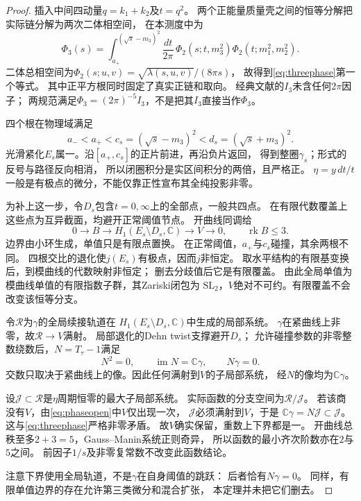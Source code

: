 \documentclass[11pt,a4paper]{ctexart}
\theoremstyle{cnplain}\newtheorem{theorem}{定理}[section]
\theoremstyle{definition}\newtheorem{definition}[theorem]{定义}
\theoremstyle{remark}\newtheorem{remark}[theorem]{注}
\newcommand{\rk}{\operatorname{rk}}\newcommand{\im}{\operatorname{im}}
\begin{document}
\begin{proof}
插入中间四动量$q=k_1+k_2$及$t=q^2$。
两个正能量质量壳之间的恒等分解把实际链分解为两次二体相空间，
在本测度中为
\[
 \Phi_3(s)=\int_{a_+}^{(\sqrt s-m_3)^2}
        \frac{dt}{2\pi}\,
        \Phi_2(s;t,m_3^2)\Phi_2(t;m_1^2,m_2^2).
\]
二体总相空间为$\Phi_2(s;u,v)=\sqrt{\lambda(s,u,v)}/(8\pi s)$，
故得到\eqref{eq:threephase}第一个等式。
其中正平方根同时固定了真实正链和取向。
经典文献的$I_3$未含任何$2\pi$因子；
两规范满足$\Phi_3=(2\pi)^{-5}I_3$，不是把其$I_3$直接当作$\Phi_3$。

四个根在物理域满足
\[
 a_-<a_+<c_s=(\sqrt s-m_3)^2<d_s=(\sqrt s+m_3)^2 .
\]
光滑紧化$E_s$属一。沿$[a_+,c_s]$的正片前进，再沿负片返回，
得到整圈$\gamma_s$；形式的反号与路径反向相消，
所以闭圈积分是实区间积分的两倍，且严格正。
$\eta=y\,dt/t$一般是有极点的微分，不能仅靠正性宣布其全纯投影非零。

为补上这一步，令$D_s$包含$t=0,\infty$上的全部点，一般共四点。
在有限代数覆盖上这些点为互异截面，均避开正常阈值节点。
开曲线同调给
\begin{equation}\label{eq:phaseopen}
 0\longrightarrow B\longrightarrow
 H_1(E_s\setminus D_s,\mathbb C)\longrightarrow V\longrightarrow0,
 \qquad \rk B\le3.
\end{equation}
边界由小环生成，单值只是有限点置换。
在正常阈值，$a_+$与$c_s$碰撞，其余两根不同。
四根交比的退化使$j(E_s)$有极点，因而$j$非恒定。
取水平结构的有限基变换后，到模曲线的代数映射非恒定；
删去分歧值后它是有限覆盖。
由此全局单值为模曲线单值的有限指数子群，其Zariski闭包为
$\mathrm{SL}_2$，$V$绝对不可约。有限覆盖不会改变该恒等分支。

令$\mathcal R$为$\gamma$的全局续接轨道在
$H_1(E_s\setminus D_s,\mathbb C)$中生成的局部系统。
$\gamma$在紧曲线上非零，故$\mathcal R\to V$满射。
局部退化的Dehn twist支撑避开$D_s$；
允许碰撞参数的非零整数绕数后，$N=T_\tau-1$满足
\[
 N^2=0,\qquad \im N=\mathbb C\gamma,\qquad N\gamma=0.
\]
交数只取决于紧曲线上的像。因此任何满射到$V$的子局部系统，
经$N$的像均为$\mathbb C\gamma$。

设$\mathcal J\subset\mathcal R$是$\eta$周期恒零的最大子局部系统。
实际函数的分支空间为$\mathcal R/\mathcal J$。
若该商没有$V$，由\eqref{eq:phaseopen}中$V$仅出现一次，
$\mathcal J$必须满射到$V$，于是
$\mathbb C\gamma=N\mathcal J\subset\mathcal J$。
这与\eqref{eq:threephase}严格非零矛盾。
故$V$确实保留，重数上下界都是一。
开曲线总秩至多$2+3=5$，Gauss--Manin系统正则奇异，
所以函数的最小齐次阶数亦在$2$与$5$之间。
前因子$1/s$及非零复常数不改变此函数结论。

注意下界使用全局轨道，不是$\gamma$在自身阈值的跳跃：
后者恰有$N\gamma=0$。
同样，有限单值边界的存在允许第三类微分和混合扩张，
本定理并未把它们删去。
\end{proof}
\end{document}
